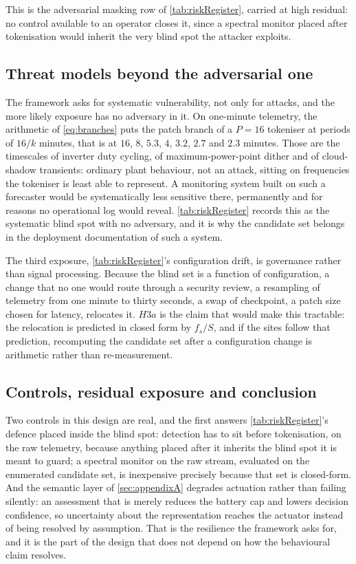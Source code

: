 This is the adversarial masking row of \autoref{tab:riskRegister}, carried at high residual: no control available to an operator closes it, since a spectral monitor placed after tokenisation would inherit the very blind spot the attacker exploits.

\subsection{Threat models beyond the adversarial one}

The framework asks for systematic vulnerability, not only for attacks, and the more likely exposure has no adversary in it. On one-minute telemetry, the arithmetic of \autoref{eq:branches} puts the patch branch of a $P{=}16$ tokeniser at periods of $16/k$ minutes, that is at $16$, $8$, $5.3$, $4$, $3.2$, $2.7$ and $2.3$ minutes. Those are the timescales of inverter duty cycling, of maximum-power-point dither and of cloud-shadow transients: ordinary plant behaviour, not an attack, sitting on frequencies the tokeniser is least able to represent. A monitoring system built on such a forecaster would be systematically less sensitive there, permanently and for reasons no operational log would reveal. \autoref{tab:riskRegister} records this as the systematic blind spot with no adversary, and it is why the candidate set belongs in the deployment documentation of such a system.

The third exposure, \autoref{tab:riskRegister}'s configuration drift, is governance rather than signal processing. Because the blind set is a function of configuration, a change that no one would route through a security review, a resampling of telemetry from one minute to thirty seconds, a swap of checkpoint, a patch size chosen for latency, relocates it. $H3a$ is the claim that would make this tractable: the relocation is predicted in closed form by $f_s/S$, and if the sites follow that prediction, recomputing the candidate set after a configuration change is arithmetic rather than re-measurement.

\subsection{Controls, residual exposure and conclusion}

Two controls in this design are real, and the first answers \autoref{tab:riskRegister}'s defence placed inside the blind spot: detection has to sit before tokenisation, on the raw telemetry, because anything placed after it inherits the blind spot it is meant to guard; a spectral monitor on the raw stream, evaluated on the enumerated candidate set, is inexpensive precisely because that set is closed-form. And the semantic layer of \autoref{sec:appendixA} degrades actuation rather than failing silently: an assessment that is merely  reduces the battery cap and lowers decision confidence, so uncertainty about the representation reaches the actuator instead of being resolved by assumption. That is the resilience the framework asks for, and it is the part of the design that does not depend on how the behavioural claim resolves.

